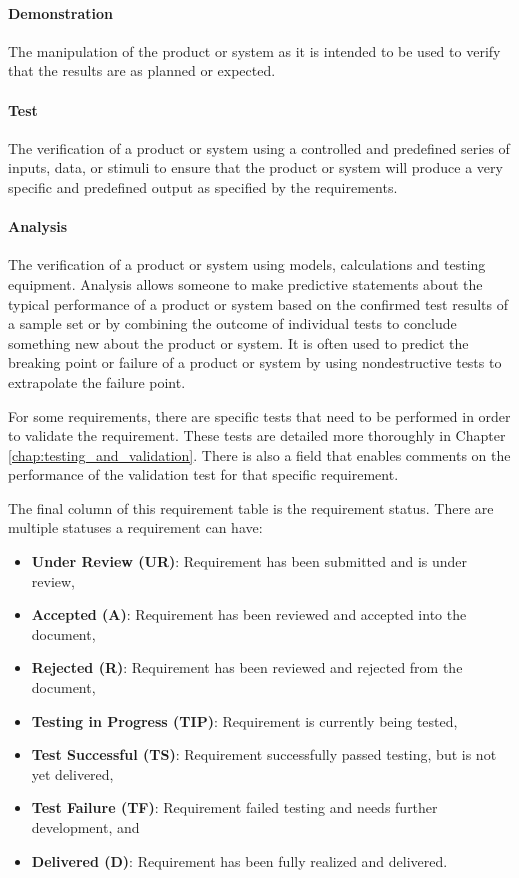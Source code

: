 \paragraph*{Demonstration} The manipulation of the product or system as it is intended to be used to verify that the results are as planned or expected.								

\paragraph*{Test} The verification of a product or system using a controlled and predefined series of inputs, data, or stimuli to ensure that the product or system will produce a very specific and predefined output as specified by the requirements.								

\paragraph*{Analysis} The verification of a product or system using models, calculations and testing equipment.
Analysis allows someone to make predictive statements about the typical performance of a product or system based on the confirmed test results of a sample set or by combining the outcome of individual tests to conclude something new about the product or system.
It is often used to predict the breaking point or failure of a product or system by using nondestructive tests to extrapolate the failure point.								

For some requirements, there are specific tests that need to be performed in order to validate the requirement.
These tests are detailed more thoroughly in Chapter \ref*{chap:testing_and_validation}.
There is also a field that enables comments on the performance of the validation test for that specific requirement.

The final column of this requirement table is the requirement status.
There are multiple statuses a requirement can have:

\begin{itemize}
	\item \textbf{Under Review (UR)}: Requirement has been submitted and is under review,
	\item \textbf{Accepted (A)}: Requirement has been reviewed and accepted into the document,
	\item \textbf{Rejected (R)}: Requirement has been reviewed and rejected from the document,
	\item \textbf{Testing in Progress (TIP)}: Requirement is currently being tested,
	\item \textbf{Test Successful (TS)}: Requirement successfully passed testing, but is not yet delivered,				
	\item \textbf{Test Failure (TF)}: Requirement failed testing and needs further development, and
	\item \textbf{Delivered (D)}: Requirement has been fully realized and delivered.
\end{itemize}

